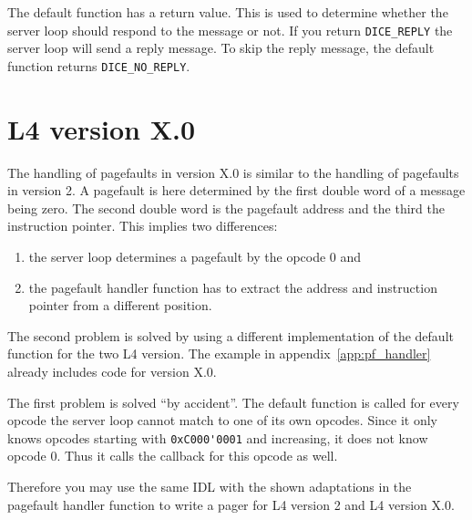 The default function has a return value. This is used to determine
whether the server loop should respond to the message or not. If you 
return \verb|DICE_REPLY| the server loop will send a reply message.
To skip the reply message, the default function returns \verb|DICE_NO_REPLY|.

\section{L4 version X.0}
The handling of pagefaults in version X.0 is similar to the handling
of pagefaults in version 2. A pagefault is here determined by the
first double word of a message being zero. The second double word
is the pagefault address and the third the instruction pointer. This
implies two differences:

\begin{enumerate}
\item the server loop determines a pagefault by the opcode 0 and
\item the pagefault handler function has to extract the address and
instruction pointer from a different position.
\end{enumerate}

The second problem is solved by using a different implementation of the
default function for the two L4 version. The example in appendix~\ref{app:pf_handler}
already includes code for version X.0.

The first problem is solved ``by accident''. The default function
is called for every opcode the server loop cannot match to one of its
own opcodes. Since it only knows opcodes starting with \verb|0xC000'0001|
and increasing, it does not know opcode 0. Thus it calls the callback
for this opcode as well.

Therefore you may use the same IDL with the shown adaptations in
the pagefault handler function to write a pager for L4 version 2 and
L4 version X.0.

